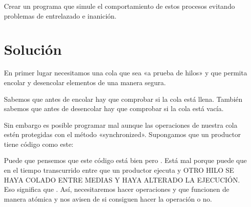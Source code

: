 \documentclass[letterpaper,10pt,spanish]{sphinxmanual}
\begin{document}
Crear un programa que simule el comportamiento de estos procesos evitando problemas de entrelazado e inanición.


\section{Solución}
\label{\detokenize{textos/tema2:solucion}}
En primer lugar necesitamos una cola que sea «a prueba de hilos» y que permita encolar y desencolar elementos de una manera segura.

Sabemos que antes de encolar hay que comprobar si la cola está llena. También sabemos que antes de desencolar hay que comprobar si la cola está vacía.

Sin embargo  es posible programar mal aunque las operaciones de nuestra cola estén protegidas con el método «synchronized». Supongamos que un productor tiene código como este:

Puede que pensemos que este código está bien pero . Está mal porque puede que en el tiempo transcurrido entre que un productor ejecuta  y  OTRO HILO SE HAYA COLADO ENTRE MEDIAS Y HAYA ALTERADO LA EJECUCIÓN. Eso significa que . Así, necesitaremos hacer operaciones  y  que funcionen de manera atómica y nos avisen de si consiguen hacer la operación o no.
\end{document}
